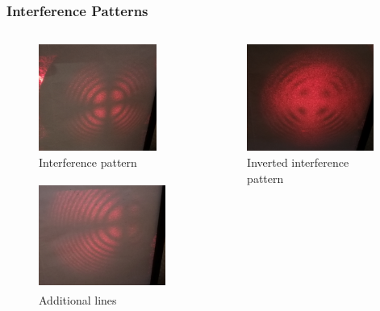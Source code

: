 \documentclass{beamer}
\begin{document}
	\begin{frame}
		\frametitle{Interference Patterns}
		
		\begin{columns}[t]
			\begin{column}{0.5\textwidth}
				\begin{figure}
					\vspace{-20pt}
					
					\centering
					\includegraphics[height=3.5cm]{res/interf3.jpg}
					\vspace{-10pt}
					\caption{\footnotesize  Interference pattern}
					\vspace{-20pt}
				\end{figure}
				\begin{figure}
					\centering
					\includegraphics[height=3.5cm]{res/additional_lines.jpg}
					\vspace{-10pt}
					\caption{\footnotesize  Additional lines}
					\vspace{-15pt}
				\end{figure}
			\end{column}
			\begin{column}{0.5\textwidth}
				\begin{figure}
					\vspace{-20pt}
					
					\centering
					\includegraphics[height=3.5cm]{res/interf_inv2.jpg}
					\vspace{-10pt}
					\caption{\footnotesize  Inverted interference pattern}
					\vspace{-10pt}
				\end{figure}
			

\end{column}
\end{columns}
\end{frame}
\end{document}
